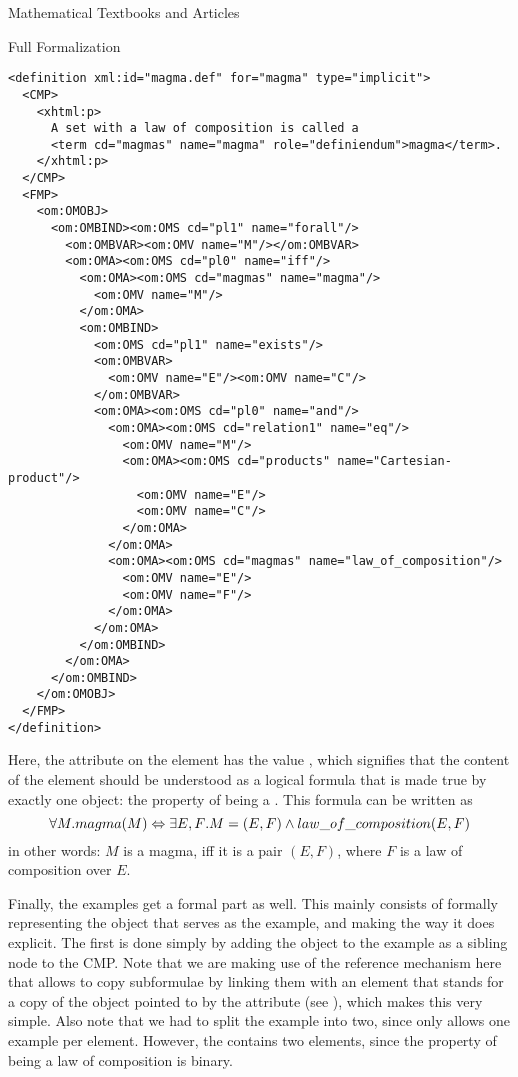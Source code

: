 \begin{tchapter}[id=algebra,short=Textbooks and Articles]{Mathematical Textbooks and Articles}
\begin{tsection}[id=formalization]{Full Formalization}
\begin{lstlisting}[label=lst:magma:formal,
    caption={The formal definition of a magma},
    index={definition,CMP,FMP,OMOBJ,OMS,OMA,OMV}]
 <definition xml:id="magma.def" for="magma" type="implicit">
  <CMP>
    <xhtml:p>
      A set with a law of composition is called a 
      <term cd="magmas" name="magma" role="definiendum">magma</term>.
    </xhtml:p>
  </CMP>
  <FMP>
    <om:OMOBJ>
      <om:OMBIND><om:OMS cd="pl1" name="forall"/>
        <om:OMBVAR><om:OMV name="M"/></om:OMBVAR>
        <om:OMA><om:OMS cd="pl0" name="iff"/>
          <om:OMA><om:OMS cd="magmas" name="magma"/>
            <om:OMV name="M"/>
          </om:OMA>
          <om:OMBIND>
            <om:OMS cd="pl1" name="exists"/>
            <om:OMBVAR>
              <om:OMV name="E"/><om:OMV name="C"/>
            </om:OMBVAR>
            <om:OMA><om:OMS cd="pl0" name="and"/>
              <om:OMA><om:OMS cd="relation1" name="eq"/>
                <om:OMV name="M"/>
                <om:OMA><om:OMS cd="products" name="Cartesian-product"/>
                  <om:OMV name="E"/>
                  <om:OMV name="C"/>
                </om:OMA>
              </om:OMA>
              <om:OMA><om:OMS cd="magmas" name="law_of_composition"/>
                <om:OMV name="E"/>
                <om:OMV name="F"/>
              </om:OMA>
            </om:OMA>
          </om:OMBIND>
        </om:OMA>
      </om:OMBIND>
    </om:OMOBJ>
  </FMP>
</definition>
\end{lstlisting}

\noindent Here, the {} attribute on the
{} element has the value
{}, which signifies that the
content of the {} element should be understood as a
logical formula that is made true by exactly one object: the
property of being a {}. This formula can be written
as
\[{\forall{M}.{magma(M)\Leftrightarrow{\exists{E,F}.{M=(E,F)\land law\_of\_composition(E,F)}}}}\]
in other words: $M$ is a magma, iff it is a pair $(E,F)$, where $F$ is a law of
composition over $E$.

Finally, the examples get a formal part as well. This mainly consists of formally
representing the object that serves as the example, and making the way it does
explicit. The first is done simply by adding the object to the example as a
sibling node to the CMP. Note that we are making use of the {\openmath} reference
mechanism here that allows to copy subformulae by linking them with an
{} element that stands for a copy of the object pointed to by the
{} attribute (see {}), which makes
this very simple. Also note that we had to split the example into two, since
{\omdoc} only allows one example per {} element. However, the
{} contains two {} elements, since the property of
being a law of composition is binary. 


\end{tsection}
\end{tchapter}
